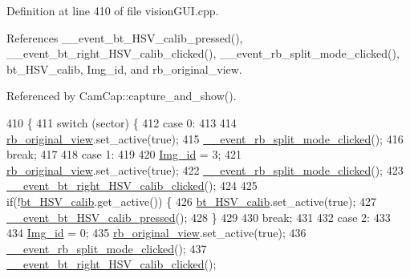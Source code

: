 Definition at line 410 of file vision\+G\+U\+I.\+cpp.



References \+\_\+\+\_\+event\+\_\+bt\+\_\+\+H\+S\+V\+\_\+calib\+\_\+pressed(), \+\_\+\+\_\+event\+\_\+bt\+\_\+right\+\_\+\+H\+S\+V\+\_\+calib\+\_\+clicked(), \+\_\+\+\_\+event\+\_\+rb\+\_\+split\+\_\+mode\+\_\+clicked(), bt\+\_\+\+H\+S\+V\+\_\+calib, Img\+\_\+id, and rb\+\_\+original\+\_\+view.



Referenced by Cam\+Cap\+::capture\+\_\+and\+\_\+show().


\begin{DoxyCode}
410                                       \{
411     \textcolor{keywordflow}{switch} (sector) \{
412         \textcolor{keywordflow}{case} 0:
413 
414             \hyperlink{class_vision_g_u_i_abb4ca4d613412da2ce06c55a8a37a7f2}{rb\_original\_view}.set\_active(\textcolor{keyword}{true});
415             \hyperlink{class_vision_g_u_i_a51c0888c14eb2b773e18d739df076e03}{\_\_event\_rb\_split\_mode\_clicked}();
416             \textcolor{keywordflow}{break};
417 
418         \textcolor{keywordflow}{case} 1:
419 
420             \hyperlink{class_vision_g_u_i_a4a46f114bc58e0f1d56b655f4bc8f9d8}{Img\_id} = 3;
421             \hyperlink{class_vision_g_u_i_abb4ca4d613412da2ce06c55a8a37a7f2}{rb\_original\_view}.set\_active(\textcolor{keyword}{true});
422             \hyperlink{class_vision_g_u_i_a51c0888c14eb2b773e18d739df076e03}{\_\_event\_rb\_split\_mode\_clicked}();
423             \hyperlink{class_vision_g_u_i_a5de4edcfe2bd349f940dc605a52bc70b}{\_\_event\_bt\_right\_HSV\_calib\_clicked}();
424 
425             \textcolor{keywordflow}{if}(!\hyperlink{class_vision_g_u_i_a9506af83c1ee97d1b4f32b3fbb53fc48}{bt\_HSV\_calib}.get\_active()) \{
426                 \hyperlink{class_vision_g_u_i_a9506af83c1ee97d1b4f32b3fbb53fc48}{bt\_HSV\_calib}.set\_active(\textcolor{keyword}{true});
427                 \hyperlink{class_vision_g_u_i_ad476738b0d45d8decb5d5789c7cbc611}{\_\_event\_bt\_HSV\_calib\_pressed}();
428             \}
429 
430             \textcolor{keywordflow}{break};
431 
432         \textcolor{keywordflow}{case} 2:
433 
434             \hyperlink{class_vision_g_u_i_a4a46f114bc58e0f1d56b655f4bc8f9d8}{Img\_id} = 0;
435             \hyperlink{class_vision_g_u_i_abb4ca4d613412da2ce06c55a8a37a7f2}{rb\_original\_view}.set\_active(\textcolor{keyword}{true});
436             \hyperlink{class_vision_g_u_i_a51c0888c14eb2b773e18d739df076e03}{\_\_event\_rb\_split\_mode\_clicked}();
437             \hyperlink{class_vision_g_u_i_a5de4edcfe2bd349f940dc605a52bc70b}{\_\_event\_bt\_right\_HSV\_calib\_clicked}();

\end{DoxyCode}
